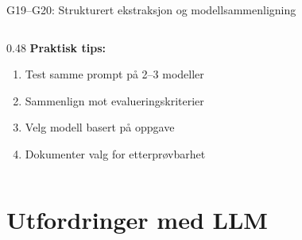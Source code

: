 \documentclass[aspectratio=169, 10pt]{beamer}
\begin{document}
\begin{frame}{G19--G20: Strukturert ekstraksjon og modellsammenligning}
\begin{columns}[T]
\begin{column}{0.48\textwidth}
            \vspace{0.2cm}
            \normalsize
            \textbf{Praktisk tips:}
            \footnotesize
            \begin{enumerate}
                \item Test samme prompt på 2--3 modeller
                \item Sammenlign mot evalueringskriterier
                \item Velg modell basert på oppgave
                \item Dokumenter valg for etterprøvbarhet
            \end{enumerate}
        \end{column}
    \end{columns}
\end{frame}

\section{Utfordringer med LLM}
\end{document}
